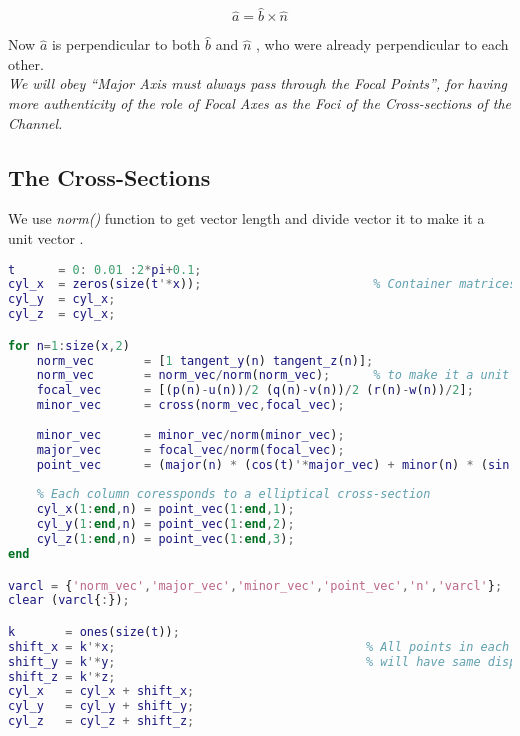 \documentclass[a4paper]{article}
\begin{document}
\[\hat{a} = \hat{b} \times \hat{n}\]

Now \(\hat{a}\) is perpendicular to both \(\hat{b}\) and
\(\hat{n}\) , who were already perpendicular to each other.
\\
\textit{We will obey ``Major Axis must always pass through the Focal Points'', for having more authenticity of the role of Focal Axes as the Foci of the Cross-sections of the Channel.}

\hypertarget{the-cross-sections}{%
\subsection{The Cross-Sections}\label{the-cross-sections}}
We use \textit{norm()} function to get vector length and divide vector it to make it a unit vector \cite{mathworks_norm}.
\begin{lstlisting}[language=matlab]
t      = 0: 0.01 :2*pi+0.1;
cyl_x  = zeros(size(t'*x));                        % Container matrices for coordinates
cyl_y  = cyl_x;
cyl_z  = cyl_x;

for n=1:size(x,2)
    norm_vec       = [1 tangent_y(n) tangent_z(n)];
    norm_vec       = norm_vec/norm(norm_vec);      % to make it a unit vector
    focal_vec      = [(p(n)-u(n))/2 (q(n)-v(n))/2 (r(n)-w(n))/2];
    minor_vec      = cross(norm_vec,focal_vec);
    
    minor_vec      = minor_vec/norm(minor_vec);
    major_vec      = focal_vec/norm(focal_vec);
    point_vec      = (major(n) * (cos(t)'*major_vec) + minor(n) * (sin(t)'*minor_vec));
 
    % Each column coressponds to a elliptical cross-section
    cyl_x(1:end,n) = point_vec(1:end,1);
    cyl_y(1:end,n) = point_vec(1:end,2);
    cyl_z(1:end,n) = point_vec(1:end,3);
end

varcl = {'norm_vec','major_vec','minor_vec','point_vec','n','varcl'};
clear (varcl{:});

k       = ones(size(t));                       
shift_x = k'*x;                                   % All points in each column
shift_y = k'*y;                                   % will have same displacement
shift_z = k'*z;
cyl_x   = cyl_x + shift_x;
cyl_y   = cyl_y + shift_y;
cyl_z   = cyl_z + shift_z;

\end{lstlisting}
\end{document}
